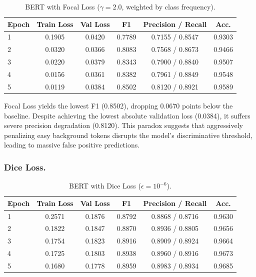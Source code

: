 \begin{table}[htbp]
    \centering
    \begin{tabular}{l c c c c c}
        \hline
        \textbf{Epoch} & \textbf{Train Loss} & \textbf{Val Loss} & \textbf{F1} & \textbf{Precision / Recall} & \textbf{Acc.} \\
        \hline
        1 & 0.1905 & 0.0420 & 0.7789 & 0.7155 / 0.8547 & 0.9303 \\
        2 & 0.0320 & 0.0366 & 0.8083 & 0.7568 / 0.8673 & 0.9466 \\
        3 & 0.0220 & 0.0379 & 0.8343 & 0.7900 / 0.8840 & 0.9507 \\
        4 & 0.0156 & 0.0361 & 0.8382 & 0.7961 / 0.8849 & 0.9548 \\
        5 & 0.0119 & 0.0384 & 0.8502 & 0.8120 / 0.8921 & 0.9589 \\
        \hline
    \end{tabular}
    \caption{BERT with Focal Loss ($\gamma = 2.0$, weighted by class frequency).}
    \label{tab:bert_focal}
\end{table}

\noindent Focal Loss yields the lowest F1 (0.8502), dropping 0.0670 points below the baseline. Despite achieving the lowest absolute validation loss (0.0384), it suffers severe precision degradation (0.8120). This paradox suggests that aggressively penalizing easy background tokens disrupts the model's discriminative threshold, leading to massive false positive predictions.

\subsubsection{Dice Loss.}

\begin{table}[htbp]
    \centering
    \begin{tabular}{l c c c c c}
        \hline
        \textbf{Epoch} & \textbf{Train Loss} & \textbf{Val Loss} & \textbf{F1} & \textbf{Precision / Recall} & \textbf{Acc.} \\
        \hline
        1 & 0.2571 & 0.1876 & 0.8792 & 0.8868 / 0.8716 & 0.9630 \\
        2 & 0.1822 & 0.1847 & 0.8870 & 0.8936 / 0.8805 & 0.9656 \\
        3 & 0.1754 & 0.1823 & 0.8916 & 0.8909 / 0.8924 & 0.9664 \\
        4 & 0.1725 & 0.1803 & 0.8938 & 0.8960 / 0.8916 & 0.9673 \\
        5 & 0.1680 & 0.1778 & 0.8959 & 0.8983 / 0.8934 & 0.9685 \\
        \hline
    \end{tabular}
    \caption{BERT with Dice Loss ($\epsilon = 10^{-6}$).}
    \label{tab:bert_dice}
\end{table}

